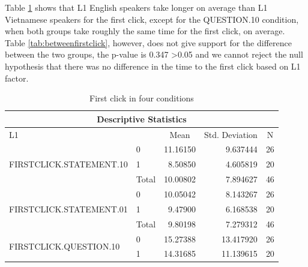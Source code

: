 \documentclass[a4paper]{article}
\begin{document}
Table \ref{tab:descriptivefirstclick} shows that L1 English speakers take longer on average than L1 Vietnamese speakers for the first click, except for the QUESTION.10 condition, when both groups take roughly the same time for the first click, on average. Table \ref{tab:betweenfirstclick}, however, does not give support for the difference between the two groups, the p-value is 0.347 \textgreater 0.05 and we cannot reject the null hypothesis that there was no difference in the time to the first click based on L1 factor.

\begin{table}[H]
\centering
\caption{First click in four conditions}
\label{tab:descriptivefirstclick}
\begin{tabular}{|l|l|r|r|r|} 
\hline
\multicolumn{5}{|c|}{Descriptive Statistics}                                                                                                 \\ 
\hline
L1                                       &       & \multicolumn{1}{c|}{Mean} & \multicolumn{1}{c|}{Std. Deviation} & \multicolumn{1}{c|}{N}  \\ 
\hline
\multirow{3}{*}{FIRSTCLICK.STATEMENT.10} & 0     & 11.16150                  & 9.637444                            & 26                      \\ 
\cline{2-5}
                                         & 1     & 8.50850                   & 4.605819                            & 20                      \\ 
\cline{2-5}
                                         & Total & 10.00802                  & 7.894627                            & 46                      \\ 
\hline
\multirow{3}{*}{FIRSTCLICK.STATEMENT.01} & 0     & 10.05042                  & 8.143267                            & 26                      \\ 
\cline{2-5}
                                         & 1     & 9.47900                   & 6.168538                            & 20                      \\ 
\cline{2-5}
                                         & Total & 9.80198                   & 7.279312                            & 46                      \\ 
\hline
\multirow{3}{*}{FIRSTCLICK.QUESTION.10}  & 0     & 15.27388                  & 13.417920                           & 26                      \\ 
\cline{2-5}
                                         & 1     & 14.31685                  & 11.139615                           & 20                      \\ 

\end{tabular}
\end{table}
\end{document}

